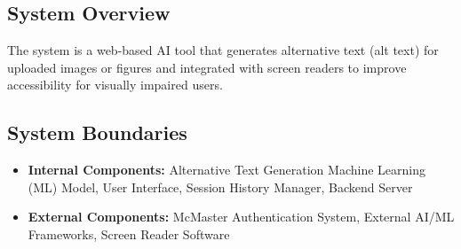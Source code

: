 \documentclass{article}
\begin{document}
\subsection{System Overview}
The system is a web-based AI tool that generates alternative text (alt text) for uploaded images or figures
and integrated with screen readers to improve accessibility for visually impaired users.
\subsection{System Boundaries}
\begin{itemize}
    \item \textbf{Internal Components:} Alternative Text Generation Machine Learning (ML) Model, User Interface, Session History Manager, Backend Server
    \item \textbf{External Components:} McMaster Authentication System, External AI/ML Frameworks, Screen Reader Software
\end{itemize}
\end{document}
